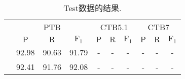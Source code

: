 \begin{table*}[tb]
  \centering
  \caption{Test数据的结果.}
  \begin{tabularx}{\textwidth}{lccccccccc}
    \toprule
                                                     & \multicolumn{3}{c}{PTB}  & \multicolumn{3}{c}{CTB5.1} & \multicolumn{3}{c}{CTB7}                                                                                                                                     \\
                                                     & $\mathrm{P}$             & $\mathrm{R}$               & $\mathrm{F}_1$           & $\mathrm{P}$             & $\mathrm{R}$             & $\mathrm{F}_1$           & $\mathrm{P}$   & $\mathrm{R}$   & $\mathrm{F}_1$ \\
    \midrule
    \citet{stern-etal-2017-minimal}                  & 92.98                    & 90.63                      & 91.79                    & -                        & -                        & -                        & -              & -              & -              \\
    \citet{gaddy-etal-2018-whats}                    & 92.41                    & 91.76                      & 92.08                    & -                        & -                        & -                        & -              & -              & -              \\

\end{tabularx}
\end{table*}
